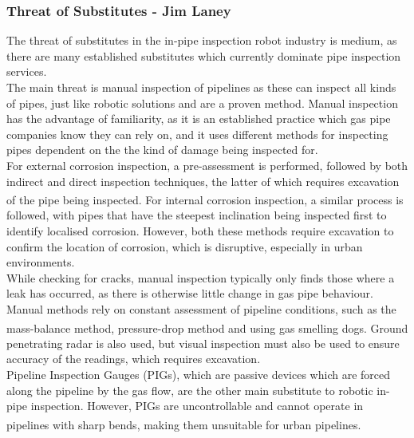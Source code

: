 \documentclass[11pt]{article}		%
\newcommand{\supercite}[1]{\textsuperscript{\cite{#1}}}		%
\begin{document}
	       \subsubsection{Threat of Substitutes - Jim Laney}
				
				The threat of substitutes in the in-pipe inspection robot industry is medium, as there are many established substitutes which currently dominate pipe inspection services.
				\\
                \hspace*{3ex}The main threat is manual inspection of pipelines as these can inspect all kinds of pipes, just like robotic solutions and are a proven method.
				Manual inspection has the advantage of familiarity, as it is an established practice which gas pipe companies know they can rely on, and it uses different methods for inspecting pipes dependent on the the kind of damage being inspected for.
				\\
                \hspace*{3ex}For external corrosion inspection, a pre-assessment is performed, followed by both indirect and direct inspection techniques, the latter of which requires excavation of the pipe being inspected\supercite{kishawy2010review}. 
				For internal corrosion inspection, a similar process is followed, with pipes that have the steepest inclination being inspected first to identify localised corrosion. 
				However, both these methods require excavation to confirm the location of corrosion, which is disruptive, especially in urban environments.
				\\
                \hspace*{3ex}While checking for cracks, manual inspection typically only finds those where a leak has occurred, as there is otherwise little change in gas pipe behaviour.
				Manual methods rely on constant assessment of pipeline conditions, such as the mass-balance method, pressure-drop method and using gas smelling dogs\supercite{kishawy2010review}.
				Ground penetrating radar is also used, but visual inspection must also be used to ensure accuracy of the readings, which requires excavation.
				\\
                \hspace*{3ex}Pipeline Inspection Gauges (PIGs), which are passive devices which are forced along the pipeline by the gas flow, are the other main substitute to robotic in-pipe inspection.
				However, PIGs are uncontrollable and cannot operate in pipelines with sharp bends\supercite{mills2017advances}, making them unsuitable for urban pipelines.
\end{document}

